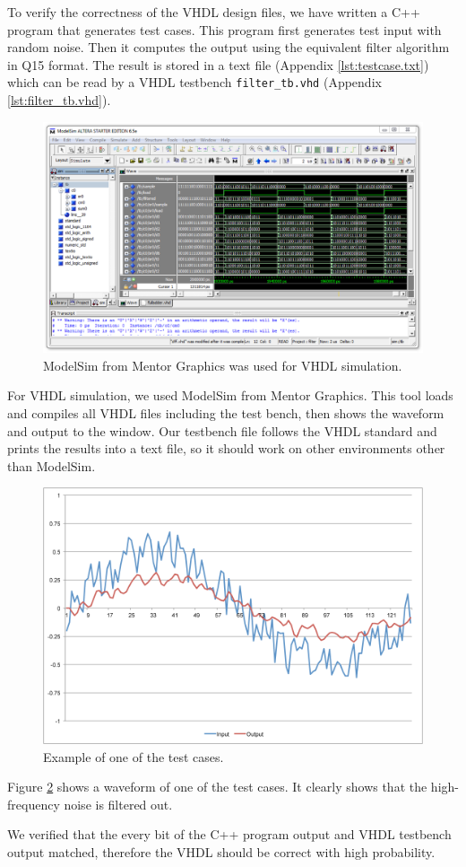 To verify the correctness of the VHDL design files, we have written a C++ program that generates test cases. This program first generates test input with random noise. Then it computes the output using the equivalent filter algorithm in Q15 format. The result is stored in a text file (Appendix \ref{lst:testcase.txt}) which can be read by a VHDL testbench \texttt{filter\_tb.vhd} (Appendix \ref{lst:filter_tb.vhd}).

\begin{figure}[htbp]
	\centering
	\includegraphics[width=6.5in]{images/modelsim}
	\caption{ModelSim from Mentor Graphics was used for VHDL simulation.}
	\label{fig:q7}
\end{figure}

For VHDL simulation, we used ModelSim from Mentor Graphics. This tool loads and compiles all VHDL files including the test bench, then shows the waveform and output to the window. Our testbench file follows the VHDL standard and prints the results into a text file, so it should work on other environments other than ModelSim.

\begin{figure}[htbp]
	\centering
	\includegraphics[width=5.5in]{images/testcase_plot}
	\caption{Example of one of the test cases.}
	\label{fig:testcase_plot}
\end{figure}

Figure \ref{fig:testcase_plot} shows a waveform of one of the test cases. It clearly shows that the high-frequency noise is filtered out.

We verified that the every bit of the C++ program output and VHDL testbench output matched, therefore the VHDL should be correct with high probability.